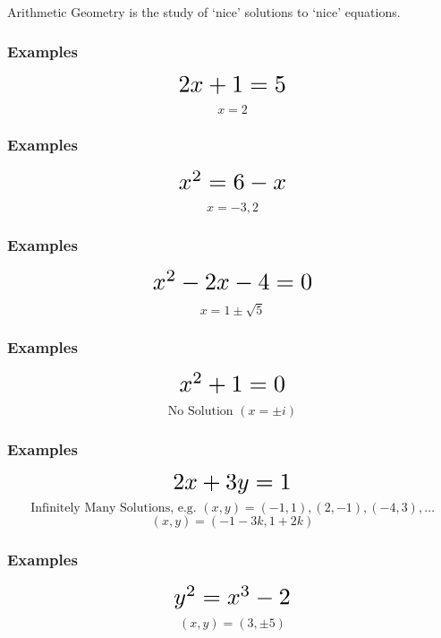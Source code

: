 
\begin{frame}[plain]
\end{frame}



\begin{frame}[plain] \frametitle{}
\vfill {\small Arithmetic Geometry is the study of `nice' solutions to `nice' equations.} \vfill
\end{frame}



\begin{frame}[plain] \frametitle{Examples}
	\[
	\scalebox{1.85}{$2x + 1 = 5$}
	\] \pause
	\[
	x = 2
	\]
\end{frame}



\begin{frame}[plain] \frametitle{Examples}
	\[
	\scalebox{1.85}{$x^2 = 6 - x$}
	\] \pause
	\[
	x = -3, 2
	\]
\end{frame}



\begin{frame}[plain] \frametitle{Examples}
	\[
	\scalebox{1.85}{$x^2 - 2x - 4 = 0$}
	\] \pause
	\[
	x= 1 \pm \sqrt{5}
	\]
\end{frame}



\begin{frame}[plain] \frametitle{Examples}
	\[
	\scalebox{1.85}{$x^2 + 1 = 0$}
	\] \pause
	\[
	\text{No Solution } (x = \pm i)
	\]
\end{frame}



\begin{frame}[plain] \frametitle{Examples}
	\[
	\scalebox{1.85}{$2x + 3y= 1$}
	\] \pause
	\[
	\text{Infinitely Many Solutions, e.g. } (x, y) = (-1, 1), (2, -1), (-4, 3), \ldots
	\]
	\[
	(x, y)= (-1 - 3k, 1 + 2k)
	\]
\end{frame}



\begin{frame}[plain] \frametitle{Examples}
	\[
	\scalebox{1.85}{$y^2 = x^3 - 2$}
	\] \pause
	\[
	(x, y)= (3, \pm 5)
	\]
\end{frame}



